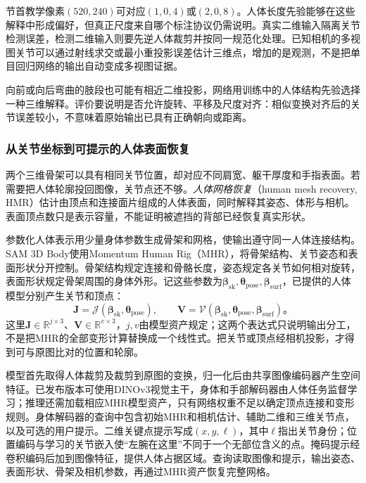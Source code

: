节首教学像素$(520,240)$可对应$(1,0,4)$或$(2,0,8)$。人体长度先验能够在这些解释中形成偏好，但真正尺度来自哪个标注协议仍需说明。真实二维输入隔离关节检测误差，检测二维输入则要先逆人体裁剪并按同一规范化处理。已知相机的多视图关节可以通过射线求交或最小重投影误差估计三维点，增加的是观测，不是把单目回归网络的输出自动变成多视图证据。

向前或向后弯曲的肢段也可能有相近二维投影，网络用训练中的人体结构先验选择一种三维解释。评价要说明是否允许旋转、平移及尺度对齐：相似变换对齐后的关节误差较小，不意味着原始输出已具有正确朝向或距离。

\subsubsection{从关节坐标到可提示的人体表面恢复}
\label{sec:vision-recognition-sam3d-body}

两个三维骨架可以具有相同关节位置，却对应不同肩宽、躯干厚度和手指表面。若需要把人体轮廓投回图像，关节点还不够。\emph{人体网格恢复}（human mesh recovery, HMR）估计由顶点和连接面片组成的人体表面，同时解释其姿态、体形与相机。表面顶点数只是表示容量，不能证明被遮挡的背部已经恢复真实形状。

参数化人体表示用少量身体参数生成骨架和网格，使输出遵守同一人体连接结构。SAM 3D Body使用Momentum Human Rig（MHR），将骨架结构、关节姿态和表面形状分开控制。骨架结构规定连接和骨骼长度，姿态规定各关节如何相对旋转，表面形状规定骨架周围的身体外形。记这些参数为$\bm{\beta}_{\mathrm{sk}},\bm{\theta}_{\mathrm{pose}},\bm{\beta}_{\mathrm{surf}}$，已提供的人体模型分别产生关节和顶点：
\[
 \bm{J}=\mathcal{J}(\bm{\beta}_{\mathrm{sk}},
                   \bm{\theta}_{\mathrm{pose}}),\qquad
 \bm{V}=\mathcal{V}(\bm{\beta}_{\mathrm{sk}},
                   \bm{\theta}_{\mathrm{pose}},
                   \bm{\beta}_{\mathrm{surf}})\text{。}
\]
这里$\bm{J}\in\mathbb{R}^{j\times3}$、$\bm{V}\in\mathbb{R}^{v\times3}$，$j,v$由模型资产规定；这两个表达式只说明输出分工，不是把MHR的全部变形计算替换成一个线性式。把关节或顶点经相机投影，才得到可与原图比对的位置和轮廓。

模型首先取得人体裁剪及裁剪到原图的变换，归一化后由共享图像编码器产生空间特征。已发布版本可使用DINOv3视觉主干，身体和手部解码器由人体任务监督学习；推理还需加载相应MHR模型资产，只有网络权重不足以确定顶点连接和变形规则。身体解码器的查询中包含初始MHR和相机估计、辅助二维和三维关节点，以及可选的用户提示。二维关键点提示写成$(x,y,\ell)$，其中$\ell$指出关节身份；位置编码与学习的关节嵌入使“左腕在这里”不同于一个无部位含义的点。掩码提示经卷积编码后加到图像特征，提供人体占据区域。查询读取图像和提示，输出姿态、表面形状、骨架及相机参数，再通过MHR资产恢复完整网格。

